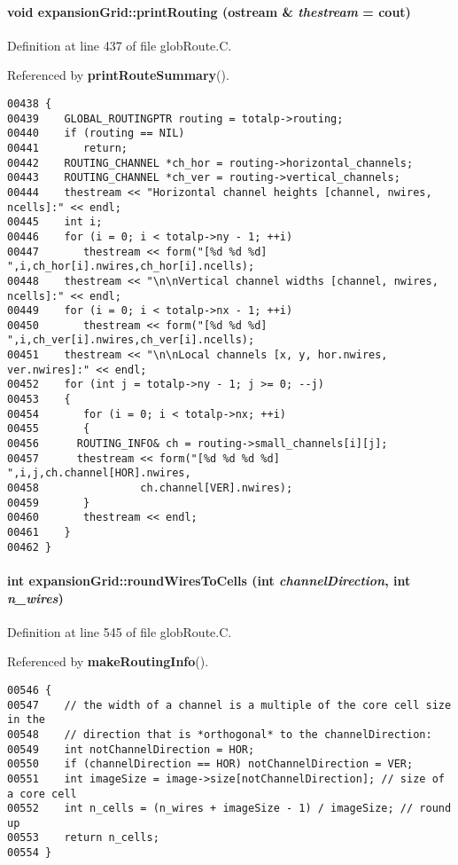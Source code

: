 \paragraph{\setlength{\rightskip}{0pt plus 5cm}void expansion\-Grid::print\-Routing (ostream \& {\em thestream} = cout)}\hfill



Definition at line 437 of file glob\-Route.C.

Referenced by {\bf print\-Route\-Summary}().\small\begin{verbatim}00438 {
00439    GLOBAL_ROUTINGPTR routing = totalp->routing;
00440    if (routing == NIL)
00441       return;
00442    ROUTING_CHANNEL *ch_hor = routing->horizontal_channels;
00443    ROUTING_CHANNEL *ch_ver = routing->vertical_channels;
00444    thestream << "Horizontal channel heights [channel, nwires, ncells]:" << endl;
00445    int i;
00446    for (i = 0; i < totalp->ny - 1; ++i)
00447       thestream << form("[%d %d %d] ",i,ch_hor[i].nwires,ch_hor[i].ncells);
00448    thestream << "\n\nVertical channel widths [channel, nwires, ncells]:" << endl;
00449    for (i = 0; i < totalp->nx - 1; ++i)
00450       thestream << form("[%d %d %d] ",i,ch_ver[i].nwires,ch_ver[i].ncells);
00451    thestream << "\n\nLocal channels [x, y, hor.nwires, ver.nwires]:" << endl;
00452    for (int j = totalp->ny - 1; j >= 0; --j)
00453    {
00454       for (i = 0; i < totalp->nx; ++i)
00455       {
00456      ROUTING_INFO& ch = routing->small_channels[i][j];
00457      thestream << form("[%d %d %d %d] ",i,j,ch.channel[HOR].nwires,
00458                ch.channel[VER].nwires);
00459       }
00460       thestream << endl;
00461    }
00462 }
\end{verbatim}\normalsize 
\label{expansionGrid_a9}
\paragraph{\setlength{\rightskip}{0pt plus 5cm}int expansion\-Grid::round\-Wires\-To\-Cells (int {\em channel\-Direction}, int {\em n\_\-wires})}\hfill



Definition at line 545 of file glob\-Route.C.

Referenced by {\bf make\-Routing\-Info}().\small\begin{verbatim}00546 {
00547    // the width of a channel is a multiple of the core cell size in the
00548    // direction that is *orthogonal* to the channelDirection:
00549    int notChannelDirection = HOR;
00550    if (channelDirection == HOR) notChannelDirection = VER;
00551    int imageSize = image->size[notChannelDirection]; // size of a core cell
00552    int n_cells = (n_wires + imageSize - 1) / imageSize; // round up
00553    return n_cells;
00554 }
\end{verbatim}\normalsize 
\label{expansionGrid_a4}
